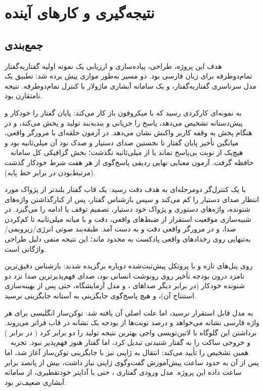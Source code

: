 \chapter{نتیجه‌گیری و کارهای آینده}
\label{ch:conclusions}

\section{جمع‌بندی}
\label{sec:summary}

هدف این پروژه، طراحی، پیاده‌سازی و ارزیابی یک نمونه اولیه گفتار‌به‌گفتار
تمام‌دوطرفه برای زبان فارسی بود. دو مسیر به‌طور موازی پیش برده شد: تطبیق یک
مدل سرتاسری گفتار‌به‌گفتار، و یک سامانه آبشاری ماژولار با کنترل تمام‌دوطرفه.
نتیجه نامتقارن بود.

 به نمونه‌ای کارکردی رسید که با میکروفون باز کار
می‌کند: پایان گفتار را خودکار و پیش‌دستانه تشخیص می‌دهد، پاسخ را جریانی و
بند‌به‌بند تولید و پخش می‌کند، و در هنگام پخش به وقفه کاربر واکنش نشان
می‌دهد. در آزمون حلقه‌ای با مرورگر واقعی، میانگین تأخیر پایان گفتار تا نخستین
صدای دستیار  و صدک نود آن  میلی‌ثانیه بود و هیچ‌یک از 
نوبت بی‌پاسخ نماند یا از  میلی‌ثانیه نگذشت؛ بخش گرافیکی کل سامانه
~ حافظه گرفت.
آزمون معنایی نهایی  ردیفی پاسخ‌گوی  از هر هفت شرط خودکار
گذشت (مرتبط‌بودن  در برابر  خط پایه).

 با یک کنترل‌گر دومرحله‌ای به هدف دقت رسید: یک قاب گفتار
بلندتر از پژواک مورد انتظار صدای دستیار را کم می‌کند و سپس بازشناس گفتار، پس
از کنارگذاشتن واژه‌های شنونده، واژه‌های دستوری و پژواک خود دستیار، تصمیم
توقف یا ادامه را می‌گیرد. در شبیه‌سازی موقعیت استقرار از ضبط‌های واقعی، دقت
 و   با میانه  میلی‌ثانیه تا کم‌کردن صدا، و
در مرورگر واقعی دقت  و   به دست آمد. طبقه‌بند صوتی
انرژی/زیر‌و‌بمی/ به‌تنهایی روی رخدادهای واقعی پادکست به 
محدود ماند؛ این نتیجه منفی دلیل طراحی واژگانی است.

 روی پنل‌های تازه و با پروتکل پیش‌ثبت‌شده دوباره برگزیده شدند:
بازشناس  دقیق‌ترین نامزد درون بودجه تأخیر روی رونوشت انسانی بود،
صدای  فهم‌پذیرترین صدا نزد دو شنونده خودکار (در برابر دیگر صداهای
،  و مدل  آزمایشگاه، حتی پس از بهینه‌سازی
استنتاج آن)، و
هیچ پاسخ‌گوی جایگزینی به آستانه جایگزینی نرسید.

 به مدل قابل استقرار نرسید، اما علت اصلی آن یافته شد:
توکن‌ساز انگلیسی  برای هر واژه فارسی  نشانه می‌خواهد و
 درصد نوبت‌ها از بودجه یک نشانه در قاب فراتر می‌روند. برداشتن این
گلوگاه با لاتین‌نویسی واجی بهترین نتیجه تولید را دو برابر کرد ( در برابر
) و خروجی ساکت را به گفتار شنیدنی تبدیل کرد، اما گفتار هنوز فهم‌پذیر
نبود. تجربه ~\cite{ohashi2025jmoshi} همین تشخیص را تأیید می‌کند:
انتقال  به ژاپنی نیز با جایگزینی توکن‌ساز آغاز شد، اما پس از آن به
حدود  ساعت پیش‌آموزش گفت‌وگوی ژاپنی نیاز داشت، بیش از پانصد برابر
 ساعت داده این پروژه. مدل ورودی گفتاری ، حتی با آداپتر خودتقطیری، از سامانه آبشاری
ضعیف‌تر بود.

